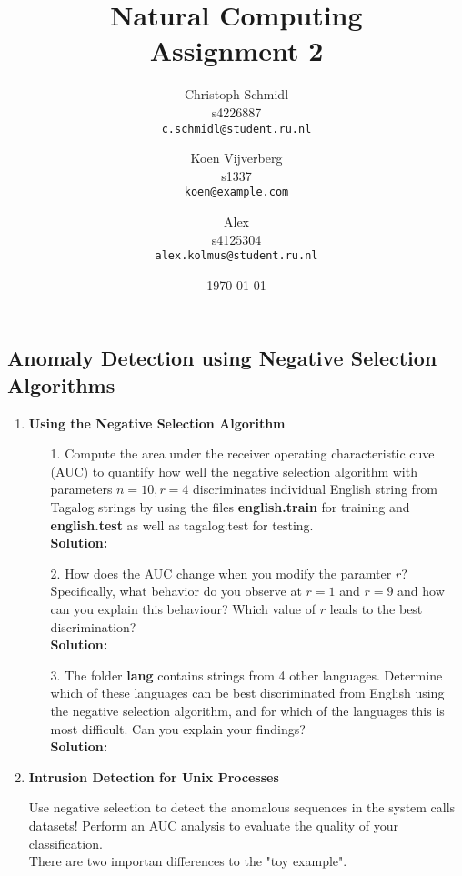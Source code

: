 \documentclass[a4paper]{article}
\title{Natural Computing\\Assignment 2}
\author{
  Christoph Schmidl\\ s4226887\\      \texttt{c.schmidl@student.ru.nl}
  \and
  Koen Vijverberg\\ s1337\\     \texttt{koen@example.com}
  \and
  Alex\\	s4125304\\	\texttt{alex.kolmus@student.ru.nl}
}
\date{\today}
\begin{document}
\maketitle


\subsection*{Anomaly Detection using Negative Selection Algorithms}

\begin{enumerate}

	\item \textbf{Using the Negative Selection Algorithm}

	\begin{enumerate}
		\item[1.] Compute the area under the receiver operating characteristic cuve (AUC) to quantify how well the negative selection algorithm with parameters $n = 10, r = 4$ discriminates individual English string from Tagalog strings by using the files \textbf{english.train} for training and \textbf{english.test} as well as tagalog.test for testing.\\
		\textbf{Solution:}\\
		
		
		
		\item[2.] How does the AUC change when you modify the paramter $r$? Specifically, what behavior do you observe at $r = 1$ and $r = 9$ and how can you explain this behaviour? Which value of $r$ leads to the best discrimination?\\
		\textbf{Solution:}\\
		
		\item[3.] The folder \textbf{lang} contains strings from 4 other languages. Determine which of these languages can be best discriminated from English using the negative selection algorithm, and for which of the languages this is most difficult. Can you explain your findings?\\
		\textbf{Solution:}\\
		
			
	\end{enumerate}		
	
	
	\item \textbf{Intrusion Detection for Unix Processes}
	
	Use negative selection to detect the anomalous sequences in the system calls datasets! Perform an AUC analysis to evaluate the quality of your classification.\\There are two importan differences to the "toy example".
	

\end{enumerate}
\end{document}
